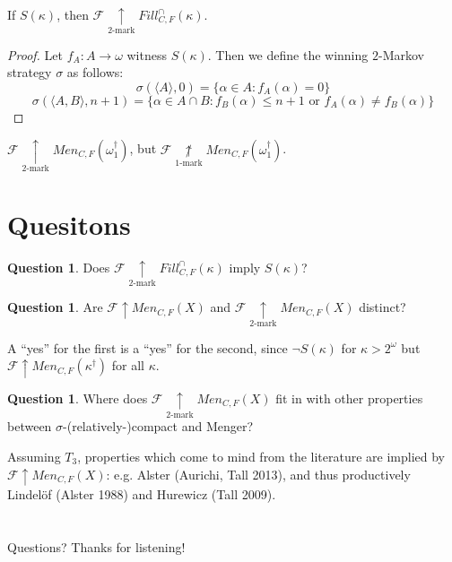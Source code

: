 \documentclass{beamer}
\theoremstyle{definition}
\newtheorem{question}[theorem]{Question}
\newcommand{\win}{\uparrow}
\newcommand{\kmarkwin}[1]{\underset{#1\text{-mark}}{\uparrow}}
\newcommand{\notkmarkwin}[1]{\underset{#1\text{-mark}}{\not\uparrow}}
\newcommand{\oneptlind}[1]{#1^\dagger}
\newcommand{\mengame}[1]{Men_{C,F}(#1)}
\newcommand{\fillgameInt}[1]{Fill^{\cap}_{C,F}(#1)}
\newcommand{\<}{\langle}
\renewcommand{\>}{\rangle}
\newcommand{\alcompS}[1]{S(#1)}
\newcommand{\pl}[1]{\mathscr{#1}}
\begin{document}
\begin{frame}

  \begin{theorem}
    If $\alcompS\kappa$, then $\pl F\kmarkwin{2} \fillgameInt\kappa$.
  \end{theorem}

  \begin{proof}
    Let $f_A:A\to\omega$ witness $\alcompS\kappa$. Then we define the
    winning $2$-Markov strategy $\sigma$ as follows:
      \[
        \sigma(\<A\>,0) = \{\alpha\in A: f_A(\alpha) = 0\}
      \]
      \[
        \sigma(\<A,B\>,n+1)
          =
        \{\alpha\in A\cap B
          :
        f_B(\alpha) \leq n+1
          \text{ or }
        f_A(\alpha)\not=f_B(\alpha)\}
      \]
  \end{proof}

  \pause

  \begin{corollary}
    $\pl F\kmarkwin{2}\mengame{\oneptlind\omega_1}$, but
    $\pl F\notkmarkwin1\mengame{\oneptlind\omega_1}$.
  \end{corollary}
\end{frame}

\section{Quesitons}

\begin{frame}
  \begin{question}
    Does $\pl F\kmarkwin2\fillgameInt{\kappa}$ imply $\alcompS\kappa$?
  \end{question}

  \pause

  \begin{question}
    Are $\pl F\win\mengame X$ and $\pl F\kmarkwin2\mengame X$ distinct?
  \end{question}

  \pause

  A ``yes'' for the first is a ``yes'' for the second, since
  $\neg\alcompS{\kappa}$ for $\kappa>2^\omega$ but
  $\pl F\win\mengame{\oneptlind\kappa}$ for all $\kappa$.
\end{frame}

\begin{frame}
  \begin{question}
    Where does $\pl F\kmarkwin2\mengame X$ fit in with other properties
    between $\sigma$-(relatively-)compact and Menger?
  \end{question}

  Assuming $T_3$, properties which come to mind
  from the literature are implied by $\pl F\win\mengame X$:
  e.g. Alster (Aurichi, Tall 2013),
  and thus productively Lindel\"of (Alster 1988) and Hurewicz (Tall 2009).
\end{frame}

\section*{}

\begin{frame}
Questions? Thanks for listening!
\end{frame}
\end{document}
